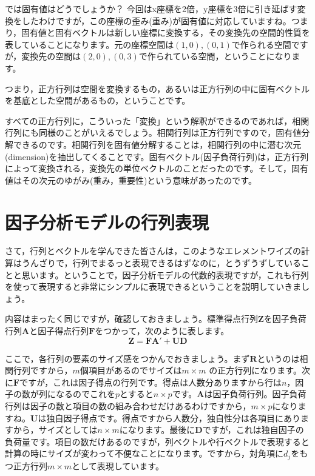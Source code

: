 \documentclass{ltjsbook}
\begin{document}
では固有値はどうでしょうか？ 今回はx座標を2倍，y座標を3倍に引き延ばす変換をしたわけですが，この座標の歪み(重み)が固有値に対応していますね。つまり，固有値と固有ベクトルは新しい座標に変換する，その変換先の空間的性質を表していることになります。元の座標空間は$(1,0),(0,1)$で作られる空間ですが，変換先の空間は$(2,0),(0,3)$で作られている空間，ということになります。

つまり，正方行列は空間を変換するもの，あるいは正方行列の中に固有ベクトルを基底とした空間があるもの，ということです。

すべての正方行列に，こういった「変換」という解釈ができるのであれば，相関行列にも同様のことがいえるでしょう。相関行列は正方行列ですので，固有値分解できるのです。相関行列を固有値分解することは，相関行列の中に潜む次元(dimension)を抽出してくることです。固有ベクトル(因子負荷行列)は，正方行列によって変換される，変換先の単位ベクトルのことだったのです。そして，固有値はその次元のゆがみ(重み，重要性)という意味があったのです。


\section{ 因子分析モデルの行列表現}
さて，行列とベクトルを学んできた皆さんは，このようなエレメントワイズの計算はうんざりで，行列でまるっと表現できるはずなのに，とうずうずしていることと思います。ということで，因子分析モデルの代数的表現ですが，これも行列を使って表現すると非常にシンプルに表現できるということを説明していきましょう。

内容はまったく同じですが，確認しておきましょう。標準得点行列$\bm{Z}$を因子負荷行列$\bm{A}$と因子得点行列$\bm{F}$をつかって，次のように表します。
\begin{equation}
	\bm{Z} = \bm{F} \bm{A} ' + \bm{U} \bm{D}
\end{equation}

ここで，各行列の要素のサイズ感をつかんでおきましょう。まず$\bm{R}$というのは相関行列ですから，$m$個項目があるのでサイズは$m \times m$ の正方行列になります。次に$\bm{F}$ですが，これは因子得点の行列です。得点は人数分ありますから行は$n$，因子の数が列になるのでこれを$p$とすると$n\times p$です。$\bm{A}$は因子負荷行列。因子負荷行列は因子の数と項目の数の組み合わせだけあるわけですから，$m \times p$になりますね。$\bm{U}$は独自因子得点です。得点ですから人数分，独自性分は各項目にありますから，サイズとしては$n \times m$になります。最後に$\bm{D}$ですが，これは独自因子の負荷量です。項目の数だけあるのですが，列ベクトルや行ベクトルで表現すると計算の時にサイズが変わって不便なことになります。ですから，対角項に$d_j$をもつ正方行列$m \times m$として表現しています。
\end{document}
